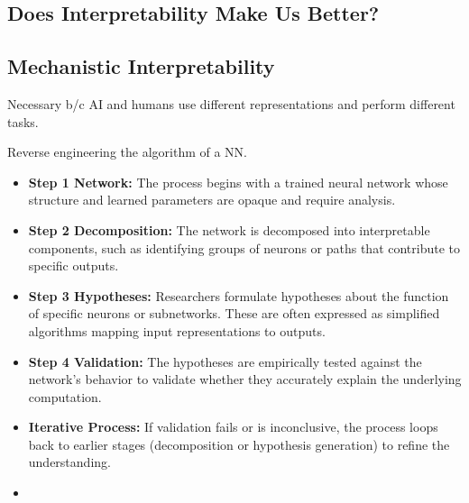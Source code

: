 \subsection{Does Interpretability Make Us Better?}

\subsection{Mechanistic Interpretability}
\begin{motivation}
    Necessary b/c AI and humans use different representations and perform different tasks. 
\end{motivation}
\begin{definition}
    Reverse engineering the algorithm of a NN. 
    \begin{itemize}
        \item \textbf{Step 1 Network:} The process begins with a trained neural network whose structure and learned parameters are opaque and require analysis.
        \item \textbf{Step 2 Decomposition:} The network is decomposed into interpretable components, such as identifying groups of neurons or paths that contribute to specific outputs.
        \item \textbf{Step 3 Hypotheses:} Researchers formulate hypotheses about the function of specific neurons or subnetworks. These are often expressed as simplified algorithms mapping input representations to outputs.
        \item \textbf{Step 4 Validation:} The hypotheses are empirically tested against the network's behavior to validate whether they accurately explain the underlying computation.
        \item \textbf{Iterative Process:} If validation fails or is inconclusive, the process loops back to earlier stages (decomposition or hypothesis generation) to refine the understanding.
    \end{itemize}    
    \begin{itemize}
        \item 
    \end{itemize}
\end{definition}

